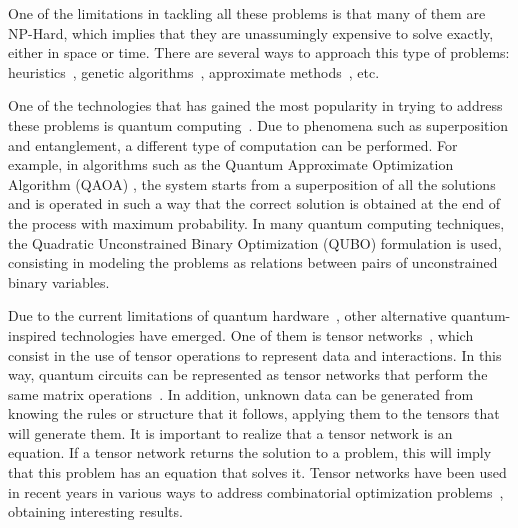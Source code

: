 One of the limitations in tackling all these problems is that many of them are NP-Hard, which implies that they are unassumingly expensive to solve exactly, either in space or time. There are several ways to approach this type of problems: heuristics~\cite{Heuristics}, genetic algorithms~\cite{Genetic}, approximate methods~\cite{Aproximated}, etc.

One of the technologies that has gained the most popularity in trying to address these problems is quantum computing~\cite{Bench_Quantum_Optim,Quantum_Block_Optim,Variational_Quantum_Optim,Generative_Quantum_Combinat}. Due to phenomena such as superposition and entanglement, a different type of computation can be performed. For example, in algorithms such as the Quantum Approximate Optimization Algorithm (QAOA) \cite{QAOA}, the system starts from a superposition of all the solutions and is operated in such a way that the correct solution is obtained at the end of the process with maximum probability. In many quantum computing techniques, the Quadratic Unconstrained Binary Optimization (QUBO) formulation \cite{QUBO} is used, consisting in modeling the problems as relations between pairs of unconstrained binary variables.

Due to the current limitations of quantum hardware~\cite{Quantum_Limitations}, other alternative quantum-inspired technologies have emerged. One of them is tensor networks~\cite{Tensor_networks}, which consist in the use of tensor operations to represent data and interactions.  In this way, quantum circuits can be represented as tensor networks that perform the same matrix operations~\cite{Simulation}. In addition, unknown data can be generated from knowing the rules or structure that it follows, applying them to the tensors that will generate them. It is important to realize that a tensor network is an equation. If a tensor network returns the solution to a problem, this will imply that this problem has an equation that solves it. Tensor networks have been used in recent years in various ways to address combinatorial optimization problems~\cite{TTOpt,TN_Constraint,TN_Optim_Quick,TN_Generative,TNGEO,QAOA_TN,HOBO_TN,HOBOTAN,TSP_TN,Task_TN,QUBO_Tridiagonal}, obtaining interesting results.

